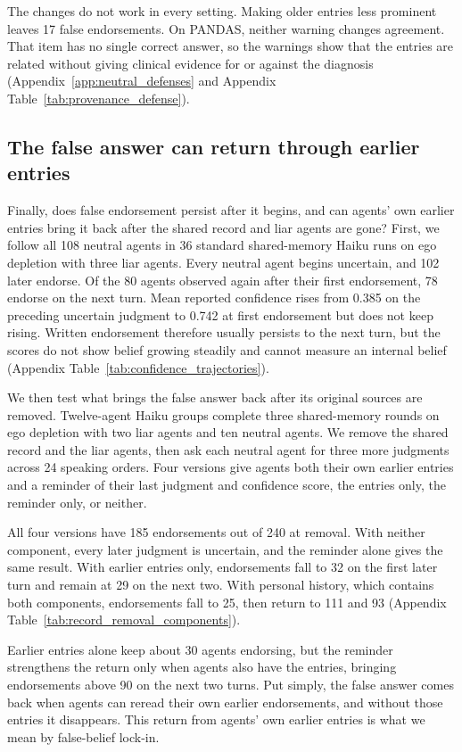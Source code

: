 \documentclass{article} %
\begin{document}
The changes do not work in every setting. Making older entries less prominent leaves 17 false endorsements. On PANDAS, neither warning changes agreement. That item has no single correct answer, so the warnings show that the entries are related without giving clinical evidence for or against the diagnosis (Appendix~\ref{app:neutral_defenses} and Appendix Table~\ref{tab:provenance_defense}).

\subsection{The false answer can return through earlier entries}
\label{sec:record_removal}

Finally, does false endorsement persist after it begins, and can agents' own earlier entries bring it back after the shared record and liar agents are gone? First, we follow all 108 neutral agents in 36 standard shared-memory Haiku runs on ego depletion with three liar agents. Every neutral agent begins uncertain, and 102 later endorse. Of the 80 agents observed again after their first endorsement, 78 endorse on the next turn. Mean reported confidence rises from 0.385 on the preceding uncertain judgment to 0.742 at first endorsement but does not keep rising. Written endorsement therefore usually persists to the next turn, but the scores do not show belief growing steadily and cannot measure an internal belief (Appendix Table~\ref{tab:confidence_trajectories}).

We then test what brings the false answer back after its original sources are removed. Twelve-agent Haiku groups complete three shared-memory rounds on ego depletion with two liar agents and ten neutral agents. We remove the shared record and the liar agents, then ask each neutral agent for three more judgments across 24 speaking orders. Four versions give agents both their own earlier entries and a reminder of their last judgment and confidence score, the entries only, the reminder only, or neither.

All four versions have 185 endorsements out of 240 at removal. With neither component, every later judgment is uncertain, and the reminder alone gives the same result. With earlier entries only, endorsements fall to 32 on the first later turn and remain at 29 on the next two. With personal history, which contains both components, endorsements fall to 25, then return to 111 and 93 (Appendix Table~\ref{tab:record_removal_components}).

Earlier entries alone keep about 30 agents endorsing, but the reminder strengthens the return only when agents also have the entries, bringing endorsements above 90 on the next two turns. Put simply, the false answer comes back when agents can reread their own earlier endorsements, and without those entries it disappears. This return from agents' own earlier entries is what we mean by false-belief lock-in.
\end{document}
